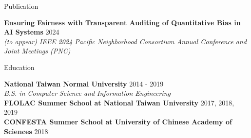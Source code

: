 \documentclass{resume} %
\begin{document}

\begin{rSection}{Publication}

{\bf Ensuring Fairness with Transparent Auditing of Quantitative Bias in AI Systems} \hfill {2024} \\
{\em (to appear) IEEE 2024 Pacific Neighborhood Consortium Annual Conference and Joint Meetings (PNC)}

\end{rSection}

\begin{rSection}{Education}

{\bf National Taiwan Normal University} \hfill {2014 - 2019} \\
{\em B.S. in Computer Science and Information Engineering} \\
{\bf FLOLAC Summer School at National Taiwan University} \hfill {2017, 2018, 2019} \\
{\bf CONFESTA Summer School at University of Chinese Academy of Sciences} \hfill {2018}

\end{rSection}

\end{document}
